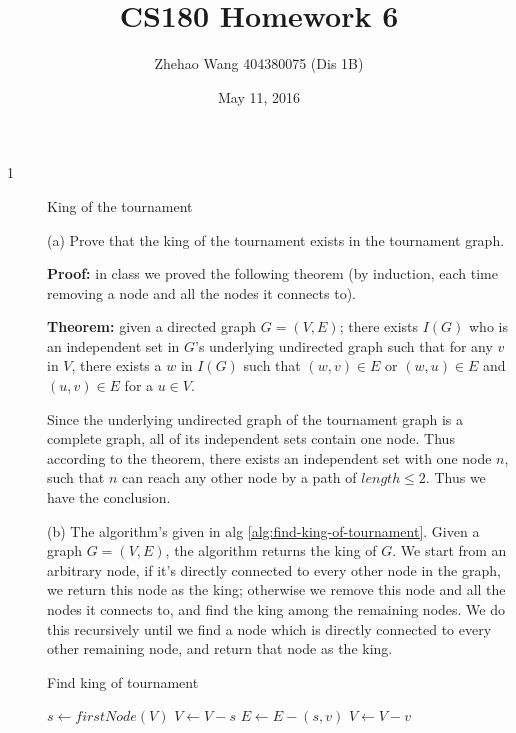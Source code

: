 \documentclass{article}
\title{CS180 Homework 6}
\author{Zhehao Wang 404380075 (Dis 1B)}
\date{May 11, 2016}
\begin{document}
\maketitle

\begin{description}

\item[1]{King of the tournament}

  (a) Prove that the king of the tournament exists in the tournament graph.

  \textbf{Proof:} in class we proved the following theorem (by induction, each time removing a node and all the nodes it connects to).

  \textbf{Theorem:} given a directed graph $G = (V, E)$; there exists $I(G)$ who is an independent set in $G$'s underlying undirected graph such that for any $v$ in $V$, there exists a $w$ in $I(G)$ such that $(w, v) \in E$ or $(w, u) \in E$ and $(u, v) \in E$ for a $u \in V$.

  Since the underlying undirected graph of the tournament graph is a complete graph, all of its independent sets contain one node. Thus according to the theorem, there exists an independent set with one node $n$, such that $n$ can reach any other node by a path of $length \leq 2$. Thus we have the conclusion.

  (b) The algorithm's given in alg \ref{alg:find-king-of-tournament}. Given a graph $G = (V, E)$, the algorithm returns the king of $G$. We start from an arbitrary node, if it's directly connected to every other node in the graph, we return this node as the king; otherwise we remove this node and all the nodes it connects to, and find the king among the remaining nodes. We do this recursively until we find a node which is directly connected to every other remaining node, and return that node as the king. 

  \begin{algorithm}[H]
  \caption{Find king of tournament}
  \label{alg:find-king-of-tournament}
    \begin{algorithmic}[1]
    
      \State $s \gets firstNode(V)$
        \State {}
      \EndIf
      \State $V \gets V - s$
        \State $E \gets E - (s,v)$
        \State $V \gets V - v$
      \EndFor
      \State {}
    \EndFunction

    \end{algorithmic}
  \end{algorithm}


\end{description}
\end{document}
